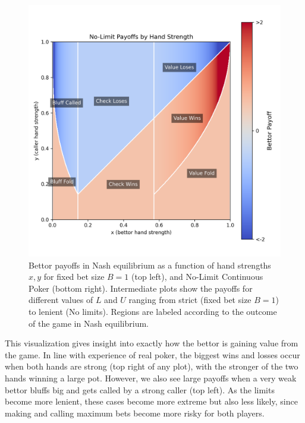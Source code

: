 \documentclass[../../main/main.tex]{subfiles}
\begin{document}
\begin{figure}[h!]
\begin{adjustwidth}{-1in}{-1in}
\begin{minipage}{0.4\textwidth}
        \end{minipage}
        \hspace{0.02\textwidth}
        \begin{minipage}{0.4\textwidth}
            \centering
            \includegraphics[width=\textwidth]{images/NoLimit_payoffs.png}
        \end{minipage}
    \end{adjustwidth}
    \caption{Bettor payoffs in Nash equilibrium as a function of hand strengths $x, y$ for fixed bet size $B=1$ (top left), and No-Limit Continuous Poker (bottom right). Intermediate plots show the payoffs for different values of $L$ and $U$ ranging from strict (fixed bet size $B=1$) to lenient (No limits). Regions are labeled according to the outcome of the game in Nash equilibrium.}
    \label{fig:payoffs}
\end{figure}

This visualization gives insight into exactly how the bettor is gaining value from the game. In line with experience of real poker, the biggest wins and losses occur when both hands are strong (top right of any plot), with the stronger of the two hands winning a large pot. However, we also see large payoffs when a very weak bettor bluffs big and gets called by a strong caller (top left). As the limits become more lenient, these cases become more extreme but also less likely, since making and calling maximum bets become more risky for both players. 
\end{document}
